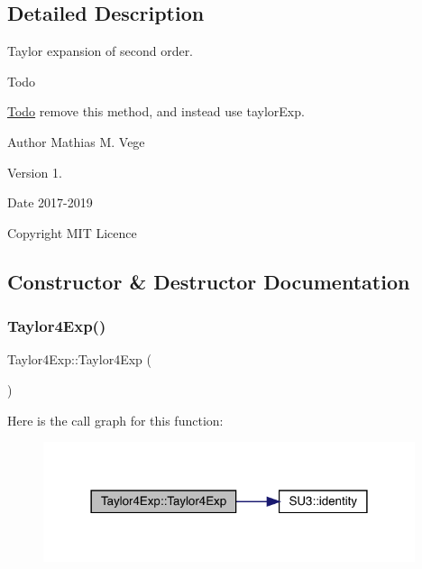 \subsection{Detailed Description}
Taylor expansion of second order. 

\begin{DoxyRefDesc}{Todo}
\item[\mbox{\hyperlink{todo__todo000003}{Todo}}]remove this method, and instead use taylor\+Exp.\end{DoxyRefDesc}


\begin{DoxyAuthor}{Author}
Mathias M. Vege 
\end{DoxyAuthor}
\begin{DoxyVersion}{Version}
1. 
\end{DoxyVersion}
\begin{DoxyDate}{Date}
2017-\/2019 
\end{DoxyDate}
\begin{DoxyCopyright}{Copyright}
M\+IT Licence 
\end{DoxyCopyright}


\subsection{Constructor \& Destructor Documentation}
\mbox{\label{class_taylor4_exp_a0eac1c3288d296110c6a5e11acc0934d}} 
\subsubsection{\texorpdfstring{Taylor4Exp()}{Taylor4Exp()}}
{\footnotesize\ttfamily Taylor4\+Exp\+::\+Taylor4\+Exp (\begin{DoxyParamCaption}{ }\end{DoxyParamCaption})}

Here is the call graph for this function\+:
\nopagebreak
\begin{figure}[H]
\begin{center}
\leavevmode
\includegraphics[width=309pt]{class_taylor4_exp_a0eac1c3288d296110c6a5e11acc0934d_cgraph}
\end{center}
\end{figure}



